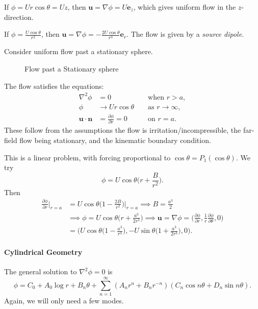 \documentclass[12pt]{article}
\begin{document}
If $\phi = U r \cos \theta = Uz$, then $\mathbf{u} = \nabla \phi = U \mathbf{e}_z$, which gives uniform flow in the $z$-direction.

If $\phi = \frac{U\cos \theta}{r^2}$, then $\mathbf{u} = \nabla \phi = - \frac{2 U \cos \theta}{r^3} \mathbf{e}_r$. The flow is given by a \emph{source dipole}.

Consider uniform flow past a stationary sphere.
\begin{figure}[h]
	\centering
	\caption{Flow past a Stationary sphere}
	\label{fig:sphere_flow}
\end{figure}

The flow satisfies the equations:
\begin{align*}
	\nabla^2 \phi &= 0  & &\text{ when } r > a, \\
	\phi &\to U r \cos \theta & &\text{ as } r \to \infty, \\
	\mathbf{u} \cdot \mathbf{n} &= \frac{\partial \phi}{\partial r} = 0 & &\text{ on } r = a.
\end{align*}
These follow from the assumptions the flow is irritation/incompressible, the far-field flow being stationary, and the kinematic boundary condition.

This is a linear problem, with forcing proportional to $\cos \theta = P_1(\cos \theta)$. We try
\[
\phi = U \cos \theta \biggl(r + \frac{B}{r^2} \biggr).
\]
Then
\begin{align*}
	\frac{\partial \phi}{\partial r} \biggr|_{r = a} &= U \cos \theta \biggl( 1 - \frac{2B}{r^2} \biggr) \biggr|_{r = a} \implies B = \frac{a^3}{2} \\
							 &\implies \phi = U \cos \theta \biggl( r + \frac{a^3}{2r^2}\biggr) \implies \mathbf{u} = \nabla \phi = \biggl( \frac{\partial \phi}{\partial r}, \frac{1}{r} \frac{\partial \phi}{\partial \theta}, 0 \biggr) \\
							 &= \biggl( U \cos \theta \biggl( 1 - \frac{a^3}{r^3} \biggr), - U \sin \theta \biggl(1 + \frac{a^3}{2r^3} \biggr), 0 \biggr).
\end{align*}

\paragraph{Cylindrical Geometry} The general solution to $\nabla^2 \phi = 0$ is
\[
\phi = C_0 + A_0 \log r + B_n \theta + \sum_{n = 1}^{\infty} (A_n r^{n} + B_nr^{-n})(C_n \cos n \theta + D_n \sin n \theta).
\]
Again, we will only need a few modes.
\end{document}
